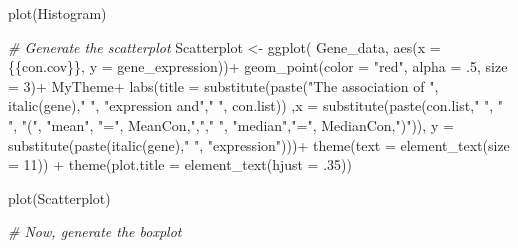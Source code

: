 \documentclass[
]{article}
\newenvironment{Shaded}{\begin{snugshade}}{\end{snugshade}}
\newcommand{\AttributeTok}[1]{\textcolor[rgb]{0.77,0.63,0.00}{#1}}
\newcommand{\CommentTok}[1]{\textcolor[rgb]{0.56,0.35,0.01}{\textit{#1}}}
\newcommand{\DecValTok}[1]{\textcolor[rgb]{0.00,0.00,0.81}{#1}}
\newcommand{\FunctionTok}[1]{\textcolor[rgb]{0.00,0.00,0.00}{#1}}
\newcommand{\NormalTok}[1]{#1}
\newcommand{\OtherTok}[1]{\textcolor[rgb]{0.56,0.35,0.01}{#1}}
\newcommand{\SpecialCharTok}[1]{\textcolor[rgb]{0.00,0.00,0.00}{#1}}
\newcommand{\StringTok}[1]{\textcolor[rgb]{0.31,0.60,0.02}{#1}}
\begin{document}
\begin{Shaded}
\begin{Highlighting}[]
\FunctionTok{plot}\NormalTok{(Histogram)}

\CommentTok{\# Generate the scatterplot}
\NormalTok{Scatterplot }\OtherTok{\textless{}{-}} \FunctionTok{ggplot}\NormalTok{( Gene\_data, }\FunctionTok{aes}\NormalTok{(}\AttributeTok{x =}\NormalTok{ \{\{con.cov\}\}, }\AttributeTok{y =}\NormalTok{ gene\_expression))}\SpecialCharTok{+}
  \FunctionTok{geom\_point}\NormalTok{(}\AttributeTok{color =} \StringTok{"red"}\NormalTok{, }\AttributeTok{alpha =}\NormalTok{ .}\DecValTok{5}\NormalTok{, }\AttributeTok{size =} \DecValTok{3}\NormalTok{)}\SpecialCharTok{+}
\NormalTok{  MyTheme}\SpecialCharTok{+}
  \FunctionTok{labs}\NormalTok{(}\AttributeTok{title =} \FunctionTok{substitute}\NormalTok{(}\FunctionTok{paste}\NormalTok{(}\StringTok{"The association of "}\NormalTok{, }\FunctionTok{italic}\NormalTok{(gene),}\StringTok{" "}\NormalTok{, }\StringTok{"expression and"}\NormalTok{,}\StringTok{" "}\NormalTok{, con.list)) ,}\AttributeTok{x =} \FunctionTok{substitute}\NormalTok{(}\FunctionTok{paste}\NormalTok{(con.list,}\StringTok{" "}\NormalTok{, }\StringTok{" "}\NormalTok{, }\StringTok{"("}\NormalTok{, }\StringTok{"mean"}\NormalTok{, }\StringTok{"="}\NormalTok{, MeanCon,}\StringTok{","}\NormalTok{,}\StringTok{" "}\NormalTok{, }\StringTok{"median"}\NormalTok{,}\StringTok{"="}\NormalTok{, MedianCon,}\StringTok{")"}\NormalTok{)), }\AttributeTok{y =} \FunctionTok{substitute}\NormalTok{(}\FunctionTok{paste}\NormalTok{(}\FunctionTok{italic}\NormalTok{(gene),}\StringTok{" "}\NormalTok{, }\StringTok{"expression"}\NormalTok{)))}\SpecialCharTok{+}
  \FunctionTok{theme}\NormalTok{(}\AttributeTok{text =} \FunctionTok{element\_text}\NormalTok{(}\AttributeTok{size =} \DecValTok{11}\NormalTok{)) }\SpecialCharTok{+} 
  \FunctionTok{theme}\NormalTok{(}\AttributeTok{plot.title =} \FunctionTok{element\_text}\NormalTok{(}\AttributeTok{hjust =}\NormalTok{ .}\DecValTok{35}\NormalTok{))}

\FunctionTok{plot}\NormalTok{(Scatterplot)}

\CommentTok{\# Now, generate the boxplot}


\end{Highlighting}
\end{Shaded}
\end{document}

